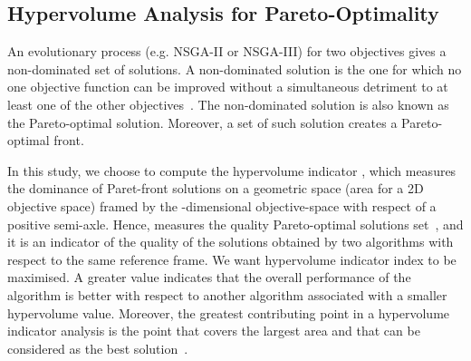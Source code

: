 \documentclass[conference]{IEEEtran}
\begin{document}
\subsection{Hypervolume Analysis for Pareto-Optimality}
\label{sec:hv_anl}
An evolutionary process (e.g. NSGA-II or NSGA-III) for two objectives gives a non-dominated set of solutions. A non-dominated solution is the one for which no one objective function can be improved without a simultaneous detriment to at least one of the other objectives~\cite{deb2000fast}. The non-dominated solution is also known as the Pareto-optimal solution. Moreover, a set of such solution creates a Pareto-optimal front. 

In this study, we choose to compute the hypervolume indicator , which measures the dominance of Paret-front solutions on a geometric space (area for a 2D objective space) framed by the -dimensional objective-space with respect of a positive semi-axle. Hence,  measures the quality Pareto-optimal solutions set~\cite{fonseca2006improved}, and it is an indicator of the quality of the solutions obtained by two algorithms with respect to the same reference frame. 
We want hypervolume indicator index  to be maximised. A greater value indicates that the overall performance of the algorithm is better with respect to another algorithm associated with a smaller hypervolume value. Moreover, the greatest contributing point in a hypervolume indicator analysis is the point that covers the largest area and that can be considered as the best solution~\cite{zitzler2003performance}.
\end{document}
